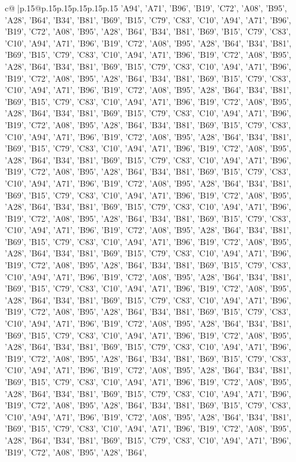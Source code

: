 \documentclass{article}
\begin{document}
{\begin{supertabular}{c@{$\;$}|p{.15\linewidth}@{}p{.15\linewidth}p{.15\linewidth}p{.15\linewidth}p{.15\linewidth}p{.15\linewidth}}
{{{'A94', 'A71', 'B96', 'B19', 'C72', 'A08', 'B95', 'A28', 'B64', 'B34', 'B81', 'B69', 'B15', 'C79', 'C83', 'C10', 'A94', 'A71', 'B96', 'B19', 'C72', 'A08', 'B95', 'A28', 'B64', 'B34', 'B81', 'B69', 'B15', 'C79', 'C83', 'C10', 'A94', 'A71', 'B96', 'B19', 'C72', 'A08', 'B95', 'A28', 'B64', 'B34', 'B81', 'B69', 'B15', 'C79', 'C83', 'C10', 'A94', 'A71', 'B96', 'B19', 'C72', 'A08', 'B95', 'A28', 'B64', 'B34', 'B81', 'B69', 'B15', 'C79', 'C83', 'C10', 'A94', 'A71', 'B96', 'B19', 'C72', 'A08', 'B95', 'A28', 'B64', 'B34', 'B81', 'B69', 'B15', 'C79', 'C83', 'C10', 'A94', 'A71', 'B96', 'B19', 'C72', 'A08', 'B95', 'A28', 'B64', 'B34', 'B81', 'B69', 'B15', 'C79', 'C83', 'C10', 'A94', 'A71', 'B96', 'B19', 'C72', 'A08', 'B95', 'A28', 'B64', 'B34', 'B81', 'B69', 'B15', 'C79', 'C83', 'C10', 'A94', 'A71', 'B96', 'B19', 'C72', 'A08', 'B95', 'A28', 'B64', 'B34', 'B81', 'B69', 'B15', 'C79', 'C83', 'C10', 'A94', 'A71', 'B96', 'B19', 'C72', 'A08', 'B95', 'A28', 'B64', 'B34', 'B81', 'B69', 'B15', 'C79', 'C83', 'C10', 'A94', 'A71', 'B96', 'B19', 'C72', 'A08', 'B95', 'A28', 'B64', 'B34', 'B81', 'B69', 'B15', 'C79', 'C83', 'C10', 'A94', 'A71', 'B96', 'B19', 'C72', 'A08', 'B95', 'A28', 'B64', 'B34', 'B81', 'B69', 'B15', 'C79', 'C83', 'C10', 'A94', 'A71', 'B96', 'B19', 'C72', 'A08', 'B95', 'A28', 'B64', 'B34', 'B81', 'B69', 'B15', 'C79', 'C83', 'C10', 'A94', 'A71', 'B96', 'B19', 'C72', 'A08', 'B95', 'A28', 'B64', 'B34', 'B81', 'B69', 'B15', 'C79', 'C83', 'C10', 'A94', 'A71', 'B96', 'B19', 'C72', 'A08', 'B95', 'A28', 'B64', 'B34', 'B81', 'B69', 'B15', 'C79', 'C83', 'C10', 'A94', 'A71', 'B96', 'B19', 'C72', 'A08', 'B95', 'A28', 'B64', 'B34', 'B81', 'B69', 'B15', 'C79', 'C83', 'C10', 'A94', 'A71', 'B96', 'B19', 'C72', 'A08', 'B95', 'A28', 'B64', 'B34', 'B81', 'B69', 'B15', 'C79', 'C83', 'C10', 'A94', 'A71', 'B96', 'B19', 'C72', 'A08', 'B95', 'A28', 'B64', 'B34', 'B81', 'B69', 'B15', 'C79', 'C83', 'C10', 'A94', 'A71', 'B96', 'B19', 'C72', 'A08', 'B95', 'A28', 'B64', 'B34', 'B81', 'B69', 'B15', 'C79', 'C83', 'C10', 'A94', 'A71', 'B96', 'B19', 'C72', 'A08', 'B95', 'A28', 'B64', 'B34', 'B81', 'B69', 'B15', 'C79', 'C83', 'C10', 'A94', 'A71', 'B96', 'B19', 'C72', 'A08', 'B95', 'A28', 'B64', 'B34', 'B81', 'B69', 'B15', 'C79', 'C83', 'C10', 'A94', 'A71', 'B96', 'B19', 'C72', 'A08', 'B95', 'A28', 'B64', 'B34', 'B81', 'B69', 'B15', 'C79', 'C83', 'C10', 'A94', 'A71', 'B96', 'B19', 'C72', 'A08', 'B95', 'A28', 'B64', 'B34', 'B81', 'B69', 'B15', 'C79', 'C83', 'C10', 'A94', 'A71', 'B96', 'B19', 'C72', 'A08', 'B95', 'A28', 'B64', 'B34', 'B81', 'B69', 'B15', 'C79', 'C83', 'C10', 'A94', 'A71', 'B96', 'B19', 'C72', 'A08', 'B95', 'A28', 'B64', 'B34', 'B81', 'B69', 'B15', 'C79', 'C83', 'C10', 'A94', 'A71', 'B96', 'B19', 'C72', 'A08', 'B95', 'A28', 'B64', 'B34', 'B81', 'B69', 'B15', 'C79', 'C83', 'C10', 'A94', 'A71', 'B96', 'B19', 'C72', 'A08', 'B95', 'A28', 'B64', 'B34', 'B81', 'B69', 'B15', 'C79', 'C83', 'C10', 'A94', 'A71', 'B96', 'B19', 'C72', 'A08', 'B95', 'A28', 'B64', 'B34', 'B81', 'B69', 'B15', 'C79', 'C83', 'C10', 'A94', 'A71', 'B96', 'B19', 'C72', 'A08', 'B95', 'A28', 'B64', 'B34', 'B81', 'B69', 'B15', 'C79', 'C83', 'C10', 'A94', 'A71', 'B96', 'B19', 'C72', 'A08', 'B95', 'A28', 'B64', }}}
\end{supertabular}}
\end{document}
